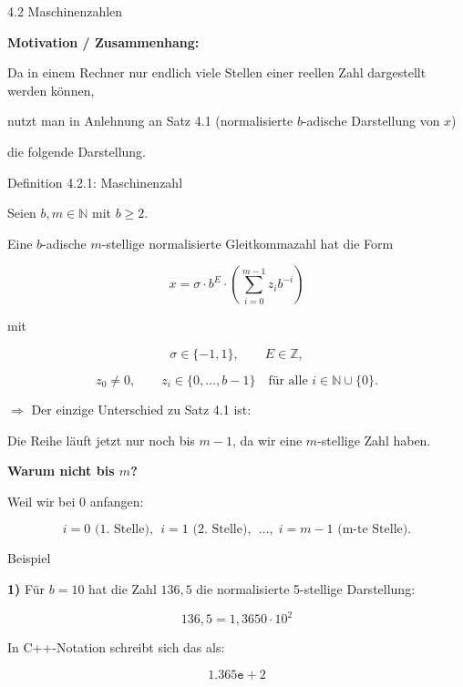 \documentclass{beamer}
\newcommand{\Z}{\mathbb{Z}}
\newcommand{\N}{\mathbb{N}}
\begin{document}
\begin{frame}{4.2 Maschinenzahlen}

\large

\textbf{Motivation / Zusammenhang:}

\vspace{0.5cm}

Da in einem Rechner nur endlich viele Stellen einer reellen Zahl dargestellt werden können,

nutzt man in Anlehnung an Satz 4.1  
(normalisierte \(b\)-adische Darstellung von \(x\))

die folgende Darstellung.

\end{frame}

\begin{frame}{Definition 4.2.1: Maschinenzahl}

\tiny

Seien \(b,m\in\N\) mit \(b\geq 2\).

Eine \(b\)-adische \(m\)-stellige normalisierte Gleitkommazahl hat die Form

\[
x=\sigma \cdot b^E \cdot
\left(\sum_{i=0}^{m-1} z_i b^{-i}\right)
\]

mit

\[
\sigma\in\{-1,1\},
\qquad
E\in\Z,
\]

\[
z_0\neq 0,
\qquad
z_i\in\{0,\dots,b-1\}
\quad \text{für alle } i\in\N\cup\{0\}.
\]

\vspace{0.4cm}

\(\Rightarrow\) Der einzige Unterschied zu Satz 4.1 ist:

Die Reihe läuft jetzt nur noch bis \(m-1\), da wir eine \(m\)-stellige Zahl haben.

\vspace{0.4cm}

\textbf{Warum nicht bis \(m\)?}

Weil wir bei \(0\) anfangen:

\[
i=0 \text{ (1. Stelle), }\;
i=1 \text{ (2. Stelle), }\;
\dots,\;
i=m-1 \text{ (m-te Stelle).}
\]

\end{frame}

\begin{frame}{Beispiel}

\large

\textbf{1)} Für \(b=10\) hat die Zahl \(136{,}5\) die normalisierte 5-stellige Darstellung:

\[
136{,}5 = 1{,}3650 \cdot 10^2
\]

\vspace{0.5cm}

In C++-Notation schreibt sich das als:

\[
1.365\texttt{e}+2
\]

\end{frame}
\end{document}

